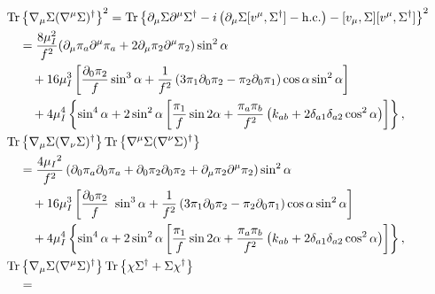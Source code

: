 \begingroup
\allowdisplaybreaks %
\begin{align}
    \notag
    & \Tr{\nabla_\mu \Sigma (\nabla^\mu \Sigma)^\dagger}^2 
    =
    \Tr{\partial_\mu \Sigma \partial^\mu \Sigma ^\dagger
    - i \left( \partial_\mu \Sigma [v^\mu,\Sigma^\dagger] - \hc \right)
    - [v_\mu, \Sigma][v^\mu,\Sigma^\dagger]
    }^2 
    \\\notag &\quad  =
    \frac{8 \mu_I^2}{f^2} 
    (\partial_\mu \pi_a \partial^\mu \pi_a + 2 \partial_\mu \pi_2 \partial^\mu \pi_2)
    \sin^2{\alpha} 
    \\ &\quad \quad \notag
    + 16 \mu_I^3 \left[
        \frac{\partial_0 \pi_2}{f}
            \sin^3{\alpha}
        + \frac{1}{f^2} \left(3 \pi_1 \partial_0 \pi_2 - \pi_2 \partial_0 \pi_1\right)
            \cos{\alpha} \sin^2{\alpha}
    \right] 
    \\ \label{l1}& \quad \quad
    + 4 \mu_I^4 
    \left\{
        \sin^4{\alpha}
        + 2 \sin^2{\alpha}
        \left[
            \frac{\pi_1}{f}\sin{2\alpha}
            + \frac{\pi_a \pi_b}{f^2}        
            \left(k_{ab} + 2\delta_{a1}\delta_{a2}\cos^2{\alpha} \right)
        \right]
    \right\}, \\
    \notag
    & \Tr{\nabla_\mu \Sigma (\nabla_\nu \Sigma)^\dagger} \Tr{\nabla^\mu \Sigma (\nabla^\nu \Sigma)^\dagger}\\ \notag
    & \quad = \frac{4 \mu_I{}^2}{f^2}
    \left(
        \partial_0 \pi_a\partial_0 \pi_a + \partial_0 \pi_2\partial_0 \pi_2 + \partial_\mu \pi_2\partial^\mu \pi_2
    \right) \sin^2{\alpha} 
    \\\notag &\quad\quad  
    + 16 \mu_I^3 \left[
        \frac{\partial_0 \pi_2}{f}\
            \sin^3{\alpha}
        + \frac{1}{f^2} \left(3 \pi_1 \partial_0 \pi_2 - \pi_2 \partial_0 \pi_1\right)
        \cos{\alpha} \sin^2{\alpha}
    \right] 
    \\ \label{l2}& \quad\quad 
    + 4 \mu_I^4 
    \left\{
        \sin^4{\alpha}
        + 2 \sin^2{\alpha}
        \left[
            \frac{\pi_1}{f}\sin{2\alpha} 
            + \frac{\pi_a \pi_b}{f^2}        
            \left(k_{ab} + 2 \delta_{a1}\delta_{a2} \cos^2{\alpha} \right)
        \right]
    \right\}, \\
    \notag
    & \Tr{\nabla_\mu \Sigma (\nabla^\mu \Sigma)^\dagger} 
    \Tr{\chi \Sigma^\dagger + \Sigma \chi^\dagger } 
    \\\notag & \quad =

\end{align}
